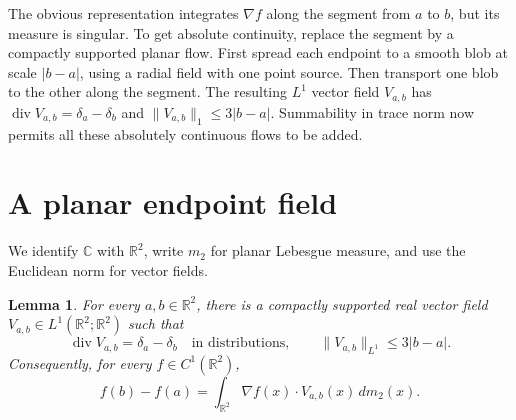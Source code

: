 \documentclass[11pt]{article}
\newtheorem{lemma}{Lemma}
\newcommand{\R}{\mathbb R}
\newcommand{\C}{\mathbb C}
\newcommand{\diver}{\operatorname{div}}
\begin{document}
The obvious representation integrates \(\nabla f\) along the segment from
\(a\) to \(b\), but its measure is singular.  To get absolute continuity,
replace the segment by a compactly supported planar flow.  First spread each
endpoint to a smooth blob at scale \(|b-a|\), using a radial field with one
point source.  Then transport one blob to the other along the segment.  The
resulting \(L^1\) vector field \(V_{a,b}\) has
\(\diver V_{a,b}=\delta_a-\delta_b\) and
\(\|V_{a,b}\|_1\leq3|b-a|\).  Summability in trace norm now permits all these
absolutely continuous flows to be added.

\section{A planar endpoint field}

We identify \(\C\) with \(\R^2\), write \(m_2\) for planar Lebesgue measure,
and use the Euclidean norm for vector fields.

\begin{lemma}\label{lem:field}
For every \(a,b\in\R^2\), there is a compactly supported real vector field
\(V_{a,b}\in L^1(\R^2;\R^2)\) such that
\[
 \diver V_{a,b}=\delta_a-\delta_b
 \quad\text{in distributions},
 \qquad
 \|V_{a,b}\|_{L^1}\leq3|b-a|.
\]
Consequently, for every \(f\in C^1(\R^2)\),
\begin{equation}\label{eq:endpoint}
 f(b)-f(a)=\int_{\R^2}\nabla f(x)\mathbin{\cdot}V_{a,b}(x)\,dm_2(x).
\end{equation}
\end{lemma}
\end{document}
